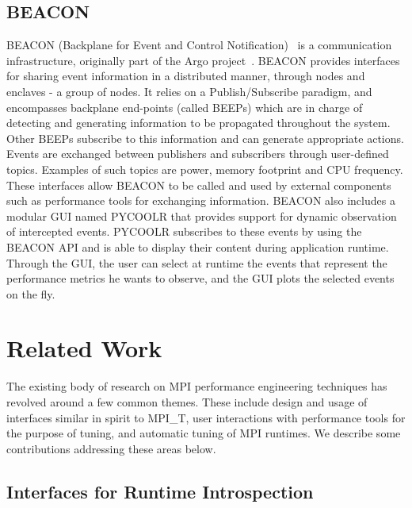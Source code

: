 \subsection{BEACON}
BEACON (Backplane for Event and Control Notification)~\cite{BEACON} is a communication infrastructure, originally part of the Argo project~\cite{Perarnau:2015:DMM:2960986.2961000}.
BEACON provides interfaces for sharing event information in a distributed manner, through nodes and enclaves - a group of nodes.
It relies on a Publish/Subscribe paradigm, and encompasses backplane end-points (called BEEPs) which are in charge of detecting and generating information to be propagated throughout the system.
Other BEEPs subscribe to this information and can generate appropriate actions.  
Events are exchanged between publishers and subscribers through user-defined topics. Examples of such topics are power, memory footprint and CPU frequency.
These interfaces allow BEACON to be called and used by external components such as performance tools for exchanging information.
BEACON also includes a modular GUI named PYCOOLR that provides support for dynamic observation of intercepted events. PYCOOLR subscribes to these events by using the BEACON API and is able to display their content during application runtime. Through the GUI, the user can select at runtime the events that represent the performance metrics he wants to observe, and the GUI plots the selected events on the fly.


\section{Related Work}
The existing body of research on MPI performance engineering techniques has revolved around a few common themes. These include design and usage of interfaces similar in spirit to MPI\_T, user interactions with performance tools for the purpose of tuning, and automatic tuning of MPI runtimes. We describe some contributions addressing these areas below.
\subsection{Interfaces for Runtime Introspection}

